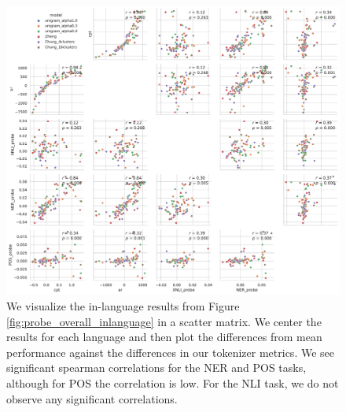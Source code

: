 \begin{figure}[H]
    \centering
    \includegraphics[width=\textwidth]{figures/probe_detailed_inlanguage_scattermatrix.pdf}
    \caption{We visualize the in-language results from Figure \ref{fig:probe_overall_inlanguage} in a scatter matrix. We center the results for each language and then plot the differences from mean performance against the differences in our tokenizer metrics. We see significant spearman correlations for the NER and POS tasks, although for POS the correlation is low. For the NLI task, we do not observe any significant correlations.}
    \label{fig:probe_overall_inlanguage_scattermatrix}
\end{figure}



